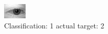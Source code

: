 \begin{figure}[h!]
\begin{center}
\includegraphics[width=0.60\columnwidth]{figures/ID504_class_1_target_2.png}
\end{center}
\caption{ Classification: 1 actual target: 2}
\label{fig:ID504_class_1_target_2}
\end{figure}
